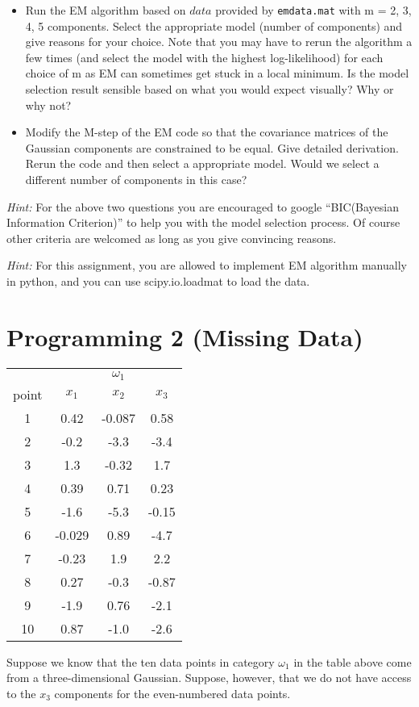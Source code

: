 \documentclass{article}
\theoremstyle{definition}
\theoremstyle{definition}
\theoremstyle{remark}
\begin{document}
\begin{itemize}
	\item Run the EM algorithm based on $data$ provided by \texttt{emdata.mat} with m =
	2, 3, 4, 5 components. Select the appropriate model (number of components) and give reasons for your choice. Note that you may have to rerun the algorithm a few times
	(and select the model with the highest log-likelihood) for each choice of m as EM can
	sometimes get stuck in a local minimum. Is the model selection result sensible based
	on what you would expect visually? Why or why not?
	\item Modify the M-step of the EM code so that the covariance matrices of
	the Gaussian components are constrained to be equal. Give detailed derivation. Rerun the code and then select a appropriate model. Would we select a different number of components in this case?
	
\end{itemize}
\emph{Hint:} For the above two questions you are encouraged to google ``BIC(Bayesian Information Criterion)'' to help you with the model selection process. Of course other criteria are welcomed as long as you give convincing reasons.

\emph{Hint:} For this assignment, you are allowed to implement EM algorithm manually in python, and you can use scipy.io.loadmat to load the data.

\section*{Programming 2 (Missing Data)}
\begin{center}
	\begin{tabular}{|c|ccc|}
		\hline
		&  &  $\omega_1$ & \\
		point & $x_1$ & $x_2$ & $x_3$ \\
		\hline
		1 & 0.42 & -0.087 & 0.58\\
		2 & -0.2 & -3.3 & -3.4\\
		3 & 1.3 & -0.32 & 1.7\\
		4 & 0.39 & 0.71 & 0.23\\
		5 & -1.6 & -5.3 & -0.15\\
		6 & -0.029 & 0.89 & -4.7\\
		7 & -0.23 & 1.9 & 2.2\\
		8 & 0.27 & -0.3 & -0.87\\
		9 & -1.9 & 0.76 & -2.1\\
		10 & 0.87 & -1.0 & -2.6 \\
		\hline
	\end{tabular}
\end{center}
Suppose we know that the ten data points in category $\omega_1$ in the table above come from a three-dimensional Gaussian. Suppose, however, that we do not have access to the $x_3$ components for the even-numbered data points.
\end{document}

